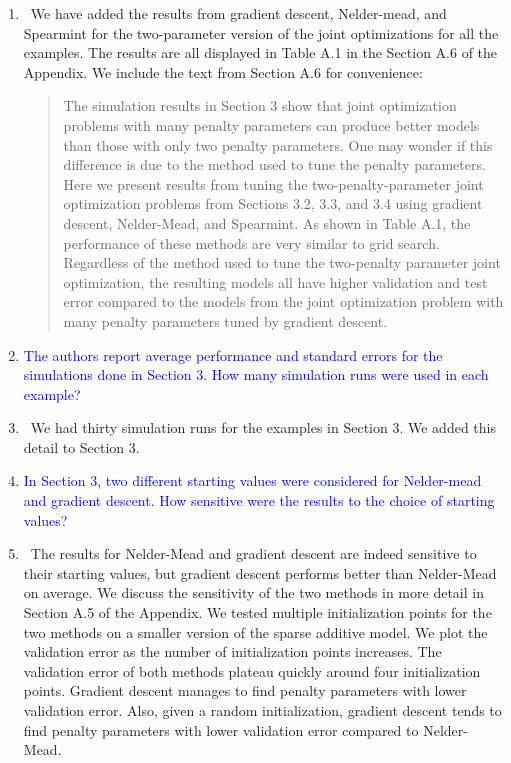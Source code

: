 \documentclass[]{article}
\newcommand{\point}[1]{\item \textcolor{blue}{#1}}
\newcommand{\reply}{\item[]\ }
\begin{document}
\begin{enumerate}
		\reply We have added the results from gradient descent, Nelder-mead, and Spearmint for the two-parameter version of the joint optimizations for all the examples. The results are all displayed in Table A.1 in the Section A.6 of the Appendix. We include the text from Section A.6 for convenience:
		
		\begin{quote}
			The simulation results in Section 3 show that joint optimization problems with many penalty parameters can produce better models than those with only two penalty parameters. One may wonder if this difference is due to the method used to tune the penalty parameters. Here we present results from tuning the two-penalty-parameter joint optimization problems from Sections 3.2, 3.3, and 3.4 using gradient descent, Nelder-Mead, and Spearmint. As shown in Table A.1, the performance of these methods are very similar to grid search. Regardless of the method used to tune the two-penalty parameter joint optimization, the resulting models all have higher validation and test error compared to the models from the joint optimization problem with many penalty parameters tuned by gradient descent.
		\end{quote}
		
		\point{The authors report average performance and standard errors for the simulations done in Section 3. How many simulation runs were used in each example?}
		
		\reply We had thirty simulation runs for the examples in Section 3. We added this detail to Section 3.
				
		\point{In Section 3, two different starting values were considered for Nelder-mead and gradient descent. How sensitive were the results to the choice of starting values?}
		
		\reply The results for Nelder-Mead and gradient descent are indeed sensitive to their starting values, but gradient descent performs better than Nelder-Mead on average. We discuss the sensitivity of the two methods in more detail in Section A.5 of the Appendix. We tested multiple initialization points for the two methods on a smaller version of the sparse additive model. We plot the validation error as the number of initialization points increases. The validation error of both methods plateau quickly around four initialization points. Gradient descent manages to find penalty parameters with lower validation error. Also, given a random initialization, gradient descent tends to find penalty parameters with lower validation error compared to Nelder-Mead.
		

\end{enumerate}
\end{document}
